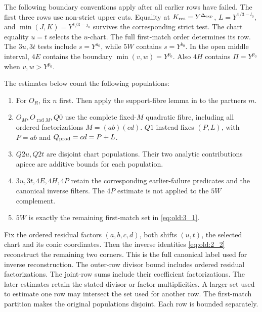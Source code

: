 The following boundary conventions apply after all earlier rows have
failed. The first three rows use non-strict upper cuts. Equality at
\(K_{\rm res}=Y^{\Delta_{\rm exp}}\),
\(L=Y^{1/3-l_0}\), and \(\min(J,K)=Y^{1/3-j_0}\) survives the
corresponding strict test. The chart equality \(u=t\) selects the
\(u\)-chart. The full first-match order determines its row. The
\(3u,3t\) tests include \(s=Y^{a_0}\), while \(5W\) contains
\(s=Y^{b_0}\). In the open middle interval, \(4E\) contains the boundary
\(\min(v,w)=Y^{p_0}\). Also \(4H\) contains \(\Pi=Y^{p_0}\) when
\(v,w>Y^{p_0}\).

\begin{remark}
The estimates below count the following populations:
\begin{enumerate}
\item For \(O_R\), fix \(n\) first. Then apply the
      support-fibre lemma in \cite{Paper1} to the partners \(m\).
\item \(O_M,O_{\operatorname{rad}M},Q0\) use the complete fixed-\(M\)
      quadratic fibre, including all ordered factorizations
      \(M=(ab)(cd)\). \(Q1\) instead fixes \((P,L)\), with
      \(P=ab\) and \(Q_{\rm prod}=cd=P+L\).
\item \(Q2u,Q2t\) are disjoint chart populations. Their two analytic
      contributions apiece are additive bounds for each population.
\item \(3u,3t,4E,4H,4P\) retain the corresponding earlier-failure
      predicates and the canonical inverse filters. The \(4P\) estimate is
      not applied to the \(5W\) complement.
\item \(5W\) is exactly the remaining first-match set in \eqref{eq:old:3_1}.
\end{enumerate}
\end{remark}

Fix the ordered residual factors \((a,b,c,d)\), both shifts \((u,t)\),
the selected chart and its conic coordinates. Then the inverse identities
\eqref{eq:old:2_2} reconstruct the remaining two corners. This is the
full canonical label used for inverse reconstruction. The outer-row
divisor bound includes ordered residual factorizations. The joint-row sums
include their coefficient factorizations. The later estimates retain the
stated divisor or factor multiplicities. A larger set used to estimate one
row may intersect the set used for another row. The first-match partition
makes the original populations disjoint. Each row is bounded separately.
